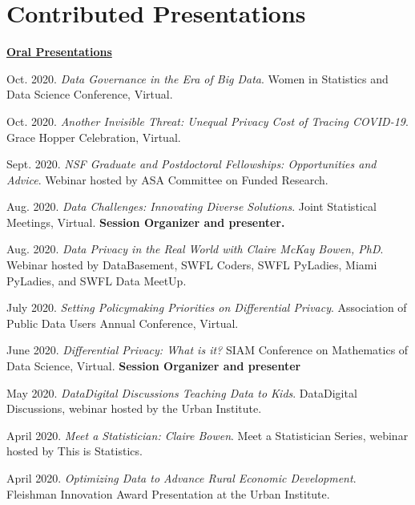 \documentclass[11pt, letterpaper, roman]{moderncv} %
\begin{document}
\vspace{-10pt}
\section{Contributed Presentations}

\underline{\textbf{\large Oral Presentations}}\normalsize
\begin{etaremune}[topsep=0pt, itemsep=6pt, partopsep=0pt, parsep=0pt]
  \item Oct. 2020. \textit{Data Governance in the Era of Big Data}. Women in Statistics and Data Science Conference, Virtual.

  \item Oct. 2020. \textit{Another Invisible Threat: Unequal Privacy Cost of Tracing COVID-19}. Grace Hopper Celebration, Virtual.
  
  \item Sept. 2020. \textit{NSF Graduate and Postdoctoral Fellowships: Opportunities and Advice}. Webinar hosted by ASA Committee on Funded Research.

  \item Aug. 2020. \textit{Data Challenges: Innovating Diverse Solutions}. Joint Statistical Meetings, Virtual. \textbf{Session Organizer and presenter.}
  
    \item Aug. 2020. \textit{Data Privacy in the Real World with Claire McKay Bowen, PhD}. Webinar hosted by DataBasement, SWFL Coders, SWFL PyLadies, Miami PyLadies, and SWFL Data MeetUp.
  
  \item July 2020. \textit{Setting Policymaking Priorities on Differential Privacy}. Association of Public Data Users Annual Conference, Virtual.

  \item June 2020. \textit{Differential Privacy: What is it?} SIAM Conference on Mathematics of Data Science, Virtual. \textbf{Session Organizer and presenter}
  
  \item May 2020. \textit{Data\@Urban Digital Discussions Teaching Data to Kids}. Data\@Urban Digital Discussions, webinar hosted by the Urban Institute.
  
  \item April 2020. \textit{Meet a Statistician: Claire Bowen}. Meet a Statistician Series, webinar hosted by This is Statistics.
  
  \item April 2020. \textit{Optimizing Data to Advance Rural Economic Development}. Fleishman Innovation Award Presentation at the Urban Institute.
  

\end{etaremune}
\end{document}
